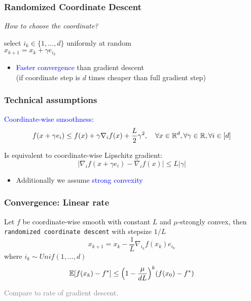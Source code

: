 \documentclass[aspectratio=149]{beamer}
\begin{document}
\begin{frame}
  \frametitle{Randomized Coordinate Descent}

  \textit{How to choose the coordinate?}

  \begin{block}{}
    \begin{center}
      select $i_k \in \{1, \dots, d\}$ uniformly at random\\
      $x_{k+1} = x_k + \gamma e_{i_k}$
    \end{center}
  \end{block}
  \vspace{1cm}
  \begin{itemize}
    \item \textcolor{blue}{Faster convergence} than gradient descent\\
          (if coordinate step is $d$ times cheaper than full gradient step)
  \end{itemize}
\end{frame}

\begin{frame}
  \frametitle{Technical assumptions}

  \begin{block}{}
    \textcolor{blue}{Coordinate-wise smoothness:}
    \begin{equation}
      f(x + \gamma e_i) \le f(x) + \gamma \nabla_i f(x) + \frac{L}{2}\gamma^2, \quad \forall x \in \mathbb{R}^d, \forall \gamma \in \mathbb{R}, \forall i \in [d]
    \end{equation}
  \end{block}
  Is equivalent to coordinate-wise Lipschitz gradient:
  \begin{equation}
    \vert \nabla_i f(x+ \gamma e_i) - \nabla_i f(x) \vert \le L \vert \gamma \vert
  \end{equation}

  \begin{itemize}
    \item Additionally we assume \textcolor{blue}{strong convexity}
  \end{itemize}
\end{frame}

\begin{frame}
  \frametitle{Convergence: Linear rate}
  \begin{theorem}
    \label{thm:}
    Let $f$ be coordinate-wise smooth with constant $L$ and $\mu$-strongly convex, then \colorbox{grey!30}{\textup{\texttt{randomized coordinate descent}}} with stepsize $1/L$
    \begin{equation}
      x_{k+1} = x_k - \frac{1}{L} \nabla_{i_k} f(x_k) e_{i_k}
    \end{equation}
    where $i_k \sim Unif(1, \dots, d)$
    \begin{equation}
      \mathbb{E} [f(x_k)- f^*] \le {\left(1 - \frac{\mu}{d L}\right)}^k (f(x_0)-f^*)
    \end{equation}
  \end{theorem}
  \textcolor{gray}{Compare to rate of gradient descent.}
\end{frame}
\end{document}
